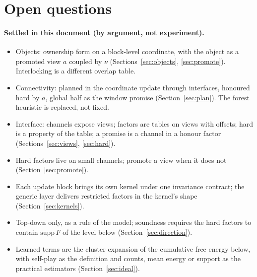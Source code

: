 \documentclass[11pt]{article}
\newcommand{\1}{\mathds{1}}
\begin{document}
\section{Open questions}
\label{sec:open}

\paragraph{Settled in this document (by argument, not experiment).}
\begin{itemize}
  \item Objects: ownership form on a block-level coordinate, with the object as
        a promoted view $a$ coupled by $\nu$ (Sections~\ref{sec:objects},
        \ref{sec:promote}). Interlocking is a different overlap table.
  \item Connectivity: planned in the coordinate update through interfaces,
        honoured hard by $a$, global half as the window promise
        (Section~\ref{sec:plan}). The forest heuristic is replaced, not fixed.
  \item Interface: channels expose views; factors are tables on views with
        offsets; hard is a property of the table; a promise is a channel in a
        honour factor (Sections~\ref{sec:views}, \ref{sec:hard}).
  \item Hard factors live on small channels; promote a view when it does not
        (Section~\ref{sec:promote}).
  \item Each update block brings its own kernel under one invariance contract;
        the generic layer delivers restricted factors in the kernel's shape
        (Section~\ref{sec:kernels}).
  \item Top-down only, as a rule of the model; soundness requires the hard
        factors to contain $\mathrm{supp}\,F$ of the level below
        (Section~\ref{sec:direction}).
  \item Learned terms are the cluster expansion of the cumulative free energy
        below, with self-play as the definition and counts, mean energy or
        support as the practical estimators (Section~\ref{sec:ideal}).
\end{itemize}
\end{document}
